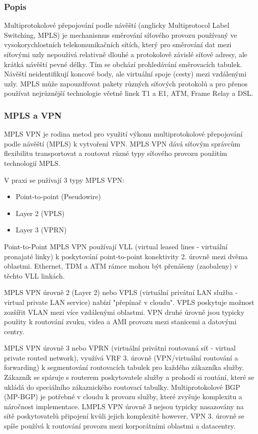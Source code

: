 \documentclass[thesis=B,czech]{FITthesis}[2012/06/26]
\begin{document}
      \subsubsection{Popis}
	  
		  Multiprotokolové přepojování podle návěští (anglicky Multiprotocol Label Switching, MPLS) je mechanismus směrování síťového provozu používaný ve vysokorychlostních telekomunikačních sítích, který pro směrování dat mezi síťovými uzly nepoužívá relativně dlouhé a protokolově závislé síťové adresy, ale krátká návěští pevné délky.
		  Tím se obchází prohledávání směrovacích tabulek. Návěští neidentifikují koncové body, ale virtuální spoje (cesty) mezi vzdálenými uzly. MPLS může zapouzdřovat pakety různých síťových protokolů a pro přenos používat nejrůznější technologie včetně linek T1 a E1, ATM, Frame Relay a DSL.

      \subsubsection{MPLS a VPN}

		MPLS VPN je rodina metod pro využití výkonu multiprotokolové přepojování podle návěští (MPLS) k vytvoření VPN.
		MPLS VPN dává síťovým správcům flexibilitu transportovat a routovat různé typy síťového provozu použitím technologií MPLS.

		V praxi se pužívají 3 typy MPLS VPN:
		
		\begin{itemize}
		  \item Point-to-point (Pseudowire)
		  \item Layer 2 (VPLS)
		  \item Layer 3 (VPRN)
		\end{itemize}
		
		Point-to-Point MPLS VPN používají VLL (virtual leased lines - virtuální pronajaté linky) k poskytování point-to-point konektivity 2. úrovně mezi dvěma oblastmi. Ethernet, TDM a ATM rámce mohou být přenášeny (zaobaleny) v těchto VLL linkách.
		
		MPLS VPN úrovně 2 (Layer 2) nebo VPLS (virtuální privátní LAN služba - virtual private LAN service) nabízí "přepínač v cloudu". VPLS poskytuje možnost zozšířit VLAN mezi více vzdálenými oblastmi. VPN druhé úrovně jsou typicky použity k routování zvuku, videa a AMI provozu mezi stanicemi a datovými centry.
		
		MPLS VPN úrovně 3 nebo VPRN (virtuální privátní routovaná síť - virtual private routed network), využívá VRF 3. úrovně (VPN/virtuální routování a forwarding) k segmentování routovacích tabulek pro každého zákazníka služby.
		Zákazník se spáruje s routerem poskytovatele služby a prohodí si routání, které se ukládá do speciálního zákaznického routovací tabulky. Multiprotokolové BGP (MP-BGP) je potřebné v cloudu k provozu služby, které zvyšuje komplexitu a náročnost implementace.
		LMPLS VPN úrovně 3 nejsou typicky nasazovány na sítě poskytovatelů připojení kvůli jejich komplexitě however, VPN 3. úrovně se spíše používá k routování provozu mezi korporátními oblastmi a datacentry.
		\cite{mpls_rfc}\cite{mpls_guide}
\end{document}

